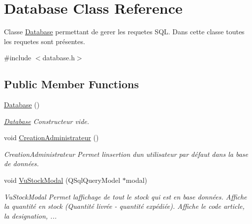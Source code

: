 \hypertarget{class_database}{}\section{Database Class Reference}
\label{class_database}


Classe \mbox{\hyperlink{class_database}{Database}} permettant de gerer les requetes S\+QL. Dans cette classe toutes les requetes sont présentes.  




{\ttfamily \#include $<$database.\+h$>$}

\subsection*{Public Member Functions}
\begin{DoxyCompactItemize}
\item 
\mbox{\label{class_database_a4703c80e6969d33565ea340f768fdadf}} 
\mbox{\hyperlink{class_database_a4703c80e6969d33565ea340f768fdadf}{Database}} ()
\begin{DoxyCompactList}\small\item\em \mbox{\hyperlink{class_database}{Database}} Constructeur vide. \end{DoxyCompactList}\item 
\mbox{\label{class_database_a1c9bb35096041517d19d9ad4a165a271}} 
void \mbox{\hyperlink{class_database_a1c9bb35096041517d19d9ad4a165a271}{Creation\+Administrateur}} ()
\begin{DoxyCompactList}\small\item\em Creation\+Administrateur Permet l\textquotesingle{}insertion d\textquotesingle{}un utilisateur par défaut dans la base de données. \end{DoxyCompactList}\item 
void \mbox{\hyperlink{class_database_aa27438ff72eb9d7b314538fe01808ba6}{Vu\+Stock\+Modal}} (Q\+Sql\+Query\+Model $\ast$modal)
\begin{DoxyCompactList}\small\item\em Vu\+Stock\+Modal Permet l\textquotesingle{}affichage de tout le stock qui est en base données. Affiche la quantité en stock (Quantité livrée -\/ quantité expédiée). Affiche le code article, la designation, ... \end{DoxyCompactList}\item 
\mbox{\label{class_database_a832119560d0d28b759930f0e25b6d58c}} 

\end{DoxyCompactItemize}
